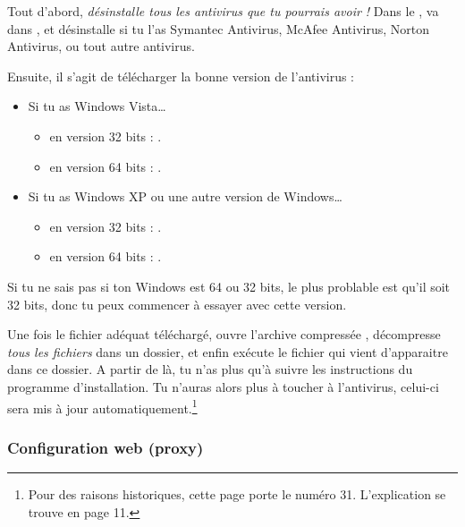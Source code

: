 Tout d'abord, \emph{d\'esinstalle tous les antivirus que tu pourrais
avoir !} Dans le , va dans ,  et
d\'esinstalle si tu l'as Symantec Antivirus, McAfee Antivirus, Norton
Antivirus, ou tout autre antivirus.

Ensuite, il s'agit de t\'el\'echarger la bonne version de l'antivirus :
\begin{itemize}

\item Si tu as Windows Vista\dots
\begin{itemize}
\item en version 32 bits : .
\item en version 64 bits : .
\end{itemize}

\item Si tu as Windows XP ou une autre version de Windows\dots
\begin{itemize}
\item en version 32 bits : .
\item en version 64 bits : .
\end{itemize}
\end{itemize}

Si tu ne sais pas si ton Windows est 64 ou 32 bits, le plus problable est qu'il
soit 32 bits, donc tu peux commencer \`a essayer avec cette version.

Une fois le fichier ad\'equat t\'el\'echarg\'e, ouvre l'archive compress\'ee , d\'ecompresse \emph{tous les fichiers} dans un dossier, et
enfin ex\'ecute le fichier  qui vient d'apparaitre dans ce dossier. A partir de l\`a, tu n'as plus qu'\`a suivre les instructions du
programme d'installation. Tu n'auras alors plus \`a toucher \`a l'antivirus, celui-ci sera mis \`a jour automatiquement.\footnote{Pour des raisons historiques, cette page porte le num\'ero 31. L'explication se trouve en page 11.}

\subsubsection{Configuration web (proxy)}


